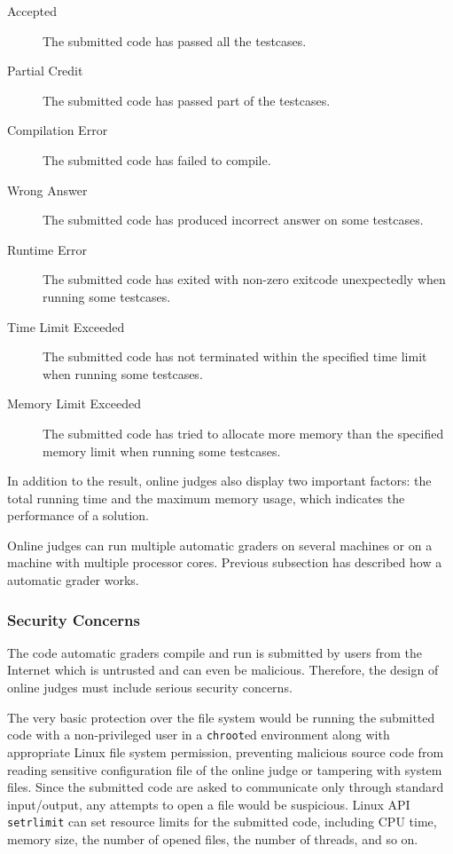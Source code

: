             \begin{description}
                \item[Accepted] The submitted code has passed all the testcases.
                \item[Partial Credit] The submitted code has passed part of the testcases.
                \item[Compilation Error] The submitted code has failed to compile.
                \item[Wrong Answer] The submitted code has produced incorrect answer on some testcases.
                \item[Runtime Error] The submitted code has exited with non-zero exitcode unexpectedly
                                     when running some testcases.
                \item[Time Limit Exceeded] The submitted code has not terminated within the specified time limit
                                           when running some testcases.
                \item[Memory Limit Exceeded] The submitted code has tried to allocate more memory than the
                                             specified memory limit when running some testcases.
            \end{description}

            In addition to the result, online judges also display two important factors:
            the total running time and the maximum memory usage,
            which indicates the performance of a solution.

            Online judges can run multiple automatic graders on several machines or
            on a machine with multiple processor cores.
            Previous subsection has described how a automatic grader works.

        \subsubsection{Security Concerns}

            The code automatic graders compile and run is submitted by users from the Internet
            which is untrusted and can even be malicious.
            Therefore, the design of online judges must include serious security concerns.

            The very basic protection over the file system would be running the submitted code
            with a non-privileged user in a \texttt{chroot}ed environment
            along with appropriate Linux file system permission,
            preventing malicious source code from reading sensitive configuration file of the online judge
            or tampering with system files.
            Since the submitted code are asked to communicate only through standard input/output,
            any attempts to open a file would be suspicious.
            Linux API \texttt{setrlimit} can set resource limits for the submitted code,
            including CPU time, memory size, the number of opened files, the number of threads, and so on.

